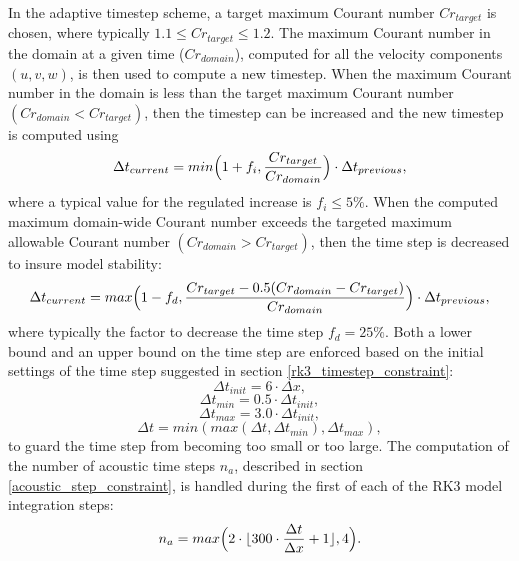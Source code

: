 In the adaptive timestep scheme, a target maximum Courant number
$Cr_{target}$ is chosen, where typically $1.1 \leq Cr_{target} \leq
1.2$.  The maximum Courant number in the domain at a given time ($Cr_{domain}$), computed
for all the velocity components $(u,v,w)$, is then used to compute a new
timestep.  When the maximum Courant number in the domain is less than
the target maximum Courant number $(Cr_{domain} < Cr_{target})$, 
then the timestep can be increased
and the new timestep is computed using
%
\begin{equation}
\Delta t_{current} = min \Big( 1+f_{i} , 
{Cr_{target} \over Cr_{domain}}\Big) \cdot \Delta t_{previous},
\label{adapt_inc_timestep}
\end{equation}
%
\noindent
where a typical value for the regulated increase is $f_{i} \leq 5\%$.  When
the computed maximum domain-wide Courant number exceeds the targeted
maximum allowable Courant number $(Cr_{domain} > Cr_{target})$, 
then the time step is 
decreased to insure model stability:
%
\begin{equation}
\Delta t_{current} = max \Big( 1-f_{d} , 
{{Cr_{target} - {0.5 ({Cr_{domain} - Cr_{target}}) }} 
\over Cr_{domain} } \Big) \cdot \Delta t_{previous},
\label{adapt_dec_timestep}
\end{equation}
%
\noindent
where typically the factor to decrease the time step $f_{d} = 25\%$.  Both a lower bound and
an upper bound on the time step are enforced based on the initial settings 
of the time step suggested in section \ref{rk3_timestep_constraint}:
%
\begin{equation}
\Delta t_{init}  = 6 \cdot \Delta x ,
\label{adapt_init_timestep}
\end{equation}
\begin{equation}
\Delta t_{min} = 0.5 \cdot \Delta t_{init},
\label{adapt_bound_min_timestep}
\end{equation}
\begin{equation}
\Delta t_{max} = 3.0 \cdot \Delta t_{init},
\label{adapt_bound_max_timestep}
\end{equation}
\begin{equation}
\Delta t = min ( max ( \Delta t, \Delta t_{min} ) , \Delta t_{max} ),
\label{adapt_bound_min_timestep}
\end{equation}
%
\noindent
to guard the time step from becoming too small or too large.  
The computation of the number of acoustic time steps $n_a$, described in section
\ref{acoustic_step_constraint}, is handled during the first of each of the
RK3 model integration steps:
%
\begin{equation}
n_a
= max \Big( 2 \cdot \lfloor { 300 \cdot {\Delta t \over \Delta x} + 1 } \rfloor , 4 \Big).
\label{adapt_acoustic_timestep}
\end{equation}
%

